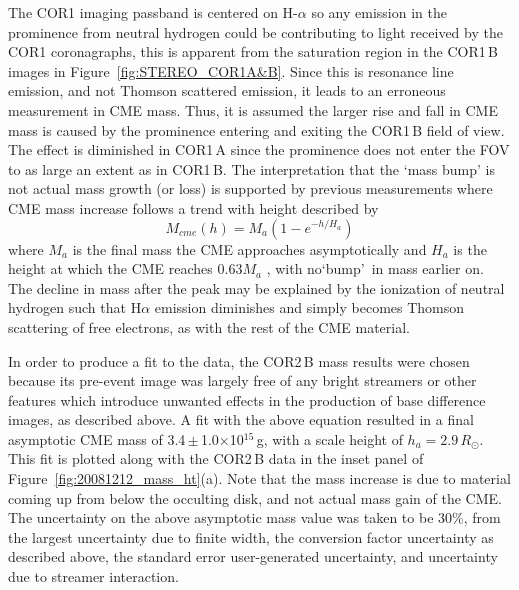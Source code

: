 The COR1 imaging passband is centered on H-$\alpha$ so any emission in the prominence from neutral hydrogen could be contributing to light received by the COR1 coronagraphs, this is apparent from the saturation region in the COR1\,B images in Figure~\ref{fig:STEREO_COR1A&B}. Since this is resonance line emission, and not Thomson scattered emission, it leads to an erroneous measurement in CME mass. Thus, it is assumed the larger rise and fall in 
CME mass is caused by the prominence entering and exiting the COR1\,B field of view. The effect is diminished in COR1\,A since the prominence does not enter the FOV to as large an extent as in COR1\,B. The interpretation that the `mass bump' is not actual mass growth (or loss) is supported by previous measurements where CME mass increase follows a trend with height described by
\begin{equation}
M_{cme}(h)=M_{a}(1-e^{-h/H_a})
\end{equation}
where $M_a$ is the final mass the CME approaches asymptotically and $H_a$ is the height at which the CME reaches 0.63$M_a$ \citep{cola09}, with no`bump'~in mass earlier on. The decline in mass after the peak may be explained by the ionization of neutral hydrogen such that H$\alpha$ emission diminishes and simply becomes Thomson scattering of free electrons, as with the rest of the CME material. 

In order to produce a fit to the data, the COR2\,B mass results were chosen because its pre-event image was largely free of any bright streamers or other features which introduce unwanted effects in the production of base difference images, as described above. A fit with the above equation resulted in a final asymptotic CME mass of 3.4\,$\pm$\,1.0$\times$10$^{15}$\,g, with a scale height of $h_a=2.9\,R_{\odot}$. This fit is plotted along with the COR2\,B data in the inset panel of Figure~\ref{fig:20081212_mass_ht}(a). Note that the mass increase is due to material coming up from below the occulting disk, and not actual mass gain of the CME. The uncertainty on the above asymptotic mass value was taken to be 30\%, from the largest uncertainty  due to finite width, the conversion factor uncertainty as described above, the standard error user-generated uncertainty, and uncertainty due to streamer interaction.

